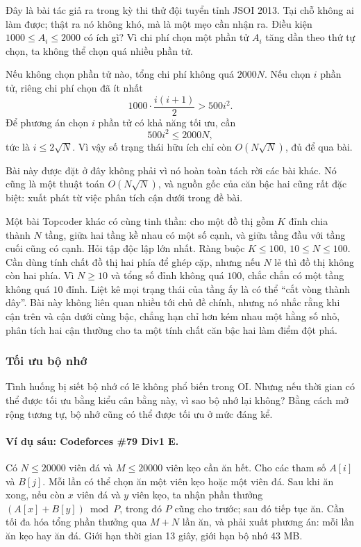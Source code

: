 \documentclass[11pt]{article}
\begin{document}
Đây là bài tác giả ra trong kỳ thi thử đội tuyển tỉnh JSOI 2013. Tại chỗ không
ai làm được; thật ra nó không khó, mà là một mẹo cần nhận ra. Điều kiện
\(1000\le A_i\le2000\) có ích gì? Vì chi phí chọn một phần tử \(A_i\) tăng dần
theo thứ tự chọn, ta không thể chọn quá nhiều phần tử.

Nếu không chọn phần tử nào, tổng chi phí không quá \(2000N\). Nếu chọn \(i\)
phần tử, riêng chi phí chọn đã ít nhất
\[
  1000\cdot \frac{i(i+1)}2 > 500i^2.
\]
Để phương án chọn \(i\) phần tử có khả năng tối ưu, cần
\[
  500i^2\le 2000N,
\]
tức là \(i\le 2\sqrt N\). Vì vậy số trạng thái hữu ích chỉ còn
\(O(N\sqrt N)\), đủ để qua bài.

Bài này được đặt ở đây không phải vì nó hoàn toàn tách rời các bài khác. Nó
cũng là một thuật toán \(O(N\sqrt N)\), và nguồn gốc của căn bậc hai cũng rất
đặc biệt: xuất phát từ việc phân tích cận dưới trong đề bài.

Một bài Topcoder khác có cùng tinh thần: cho một đồ thị gồm \(K\) đỉnh chia
thành \(N\) tầng, giữa hai tầng kề nhau có một số cạnh, và giữa tầng đầu với
tầng cuối cũng có cạnh. Hỏi tập độc lập lớn nhất. Ràng buộc
\(K\le100\), \(10\le N\le100\). Cần dùng tính chất đồ thị hai phía để ghép cặp,
nhưng nếu \(N\) lẻ thì đồ thị không còn hai phía. Vì \(N\ge10\) và tổng số
đỉnh không quá \(100\), chắc chắn có một tầng không quá \(10\) đỉnh. Liệt kê
mọi trạng thái của tầng ấy là có thể ``cắt vòng thành dây''. Bài này không
liên quan nhiều tới chủ đề chính, nhưng nó nhắc rằng khi cận trên và cận dưới
cùng bậc, chẳng hạn chỉ hơn kém nhau một hằng số nhỏ, phân tích hai cận thường
cho ta một tính chất căn bậc hai làm điểm đột phá.

\subsubsection{Tối ưu bộ nhớ}

Tình huống bị siết bộ nhớ có lẽ không phổ biến trong OI. Nhưng nếu thời gian
có thể được tối ưu bằng kiểu cân bằng này, vì sao bộ nhớ lại không? Bằng cách
mở rộng tương tự, bộ nhớ cũng có thể được tối ưu ở mức đáng kể.

\paragraph{Ví dụ sáu: Codeforces \#79 Div1 E.}
Có \(N\le20000\) viên đá và \(M\le20000\) viên kẹo cần ăn hết. Cho các tham số
\(A[i]\) và \(B[j]\). Mỗi lần có thể chọn ăn một viên kẹo hoặc một viên đá.
Sau khi ăn xong, nếu còn \(x\) viên đá và \(y\) viên kẹo, ta nhận phần thưởng
\((A[x]+B[y])\bmod P\), trong đó \(P\) cũng cho trước; sau đó tiếp tục ăn. Cần
tối đa hóa tổng phần thưởng qua \(M+N\) lần ăn, và phải xuất phương án: mỗi
lần ăn kẹo hay ăn đá. Giới hạn thời gian 13 giây, giới hạn bộ nhớ 43 MB.
\end{document}

